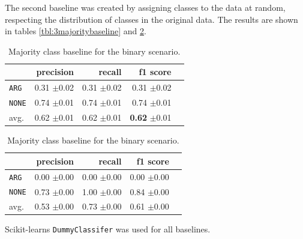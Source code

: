 The second baseline was created by assigning classes to the data at random, respecting the distribution of classes in the original data. The results are shown in tables \ref{tbl:3majoritybaseline} and \ref{tbl:binstrat}.



\begin{table}[!htb]
	\begin{minipage}{.5\linewidth}
		\caption{Random (stratified) baseline for the binary scenario.}
		\label{tbl:binmaj}
		\centering
		      
		\begin{tabularx}{0.97\linewidth}{Xrrrr}
			\toprule
			              & precision                    & recall                       & f1 score                              \\ \midrule 
			\texttt{ARG}  & 0.31 \scriptsize{$\pm$0.02} & 0.31 \scriptsize{$\pm$0.02} & 0.31 \scriptsize{$\pm$0.02}          \\ 
			\texttt{NONE} & 0.74 \scriptsize{$\pm$0.01} & 0.74 \scriptsize{$\pm$0.01} & 0.74 \scriptsize{$\pm$0.01}          \\ 
			avg.       & 0.62 \scriptsize{$\pm$0.01} & 0.62 \scriptsize{$\pm$0.01} & \textbf{0.62} \scriptsize{$\pm$0.01} \\ 
			\bottomrule
		\end{tabularx}
		
	\end{minipage}%
	\begin{minipage}{.5\linewidth}
		\centering
		\caption{Majority class baseline for the binary scenario.}
		\label{tbl:binstrat}
		\begin{tabularx}{0.97\linewidth}{Xrrrr}
			\toprule
			              & precision                    & recall                       & f1 score                     \\ \midrule 
			\texttt{ARG}  & 0.00 \scriptsize{$\pm$0.00} & 0.00 \scriptsize{$\pm$0.00} & 0.00 \scriptsize{$\pm$0.00} \\ 
			\texttt{NONE} & 0.73 \scriptsize{$\pm$0.00} & 1.00 \scriptsize{$\pm$0.00} & 0.84 \scriptsize{$\pm$0.00} \\ 
			avg.       & 0.53 \scriptsize{$\pm$0.00} & 0.73 \scriptsize{$\pm$0.00} & 0.61 \scriptsize{$\pm$0.00} \\ 
			\bottomrule
		\end{tabularx}
	\end{minipage} 
\end{table}
Scikit-learns \texttt{DummyClassifer} was used for all baselines.

